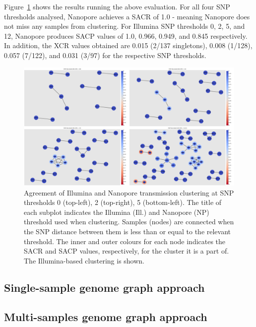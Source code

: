 Figure~{\ref{827243}} shows the results running the
above evaluation. For all four SNP thresholds analysed, Nanopore
achieves a SACR of 1.0 - meaning Nanopore does not miss any samples from
clustering. For Illumina SNP thresholds 0, 2, 5, and 12, Nanopore
produces SACP values of 1.0, 0.966, 0.949, and 0.845 respectively. In
addition, the XCR values obtained are 0.015 (2/137 singletons), 0.008
(1/128), 0.057 (7/122), and 0.031 (3/97) for the respective SNP
thresholds.~


\begin{figure}
\begin{center}
\includegraphics[width=0.90\columnwidth]{Chapter2/Figs/bcftools_clusters.png}
\caption{{Agreement of Illumina and Nanopore transmission clustering at SNP
thresholds 0 (top-left), 2 (top-right), 5 (bottom-left). The title of
each subplot indicates the Illumina (Ill.) and Nanopore (NP) threshold
used when clustering. Samples (nodes) are connected when the SNP
distance between them is less than or equal to the relevant threshold.
The inner and outer colours for each node indicates the SACR and SACP
values, respectively, for the cluster it is a part of. The
Illumina-based clustering is shown.
{\label{827243}}%
}}
\end{center}
\end{figure}

\subsection{Single-sample genome graph approach}

\subsection{Multi-samples genome graph approach}


